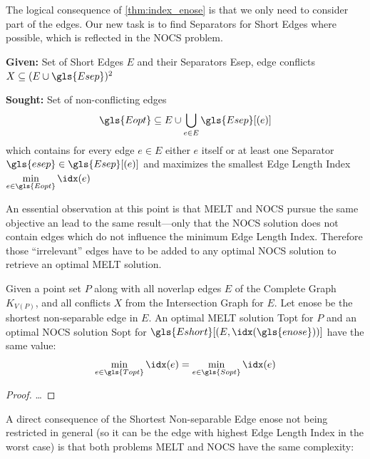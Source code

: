 The logical consequence of \cref{thm:index_enose} is that we only need
to consider part of the edges. Our new task is to find Separators for
Short Edges where possible, which is reflected in the \gls{NOCS}
problem.

\begin{problem}
  \hfill
  \begin{labeling}{\hspace{4em}}
    \item[\textbf{Given:}]
      Set of Short Edges \(E\) and their Separators \gls{Esep},
      edge conflicts \(X \subseteq (E \cup \gls{Esep})^2\)
    \item[\textbf{Sought:}]
      Set of non-conflicting edges
      \[
        \gls{Eopt} \subseteq E
        \cup \bigcup\limits_{e \in E} \gls{Esep}[(e)]
      \]
      which contains for every edge \(e \in E\) either \(e\) itself
      or at least one Separator \(\gls{esep} \in \gls{Esep}[(e)]\)
      and maximizes the smallest Edge Length Index
      \(\min\limits_{e \in \gls{Eopt}} \idx(e)\)
  \end{labeling}
\end{problem}

An essential observation at this point is that \gls{MELT} and
\gls{NOCS} pursue the same objective an lead to the same result---only
that the \gls{NOCS} solution does not contain edges which do not
influence the minimum Edge Length Index. Therefore those
``irrelevant'' edges have to be added to any optimal \gls{NOCS}
solution to retrieve an optimal \gls{MELT} solution.

\begin{theorem}
  \label{thm:equality_melt_nocs}
  Given a point set \(P\) along with all \gls{noverlap} edges \(E\)
  of the Complete Graph \(K_{V(P)}\), and all conflicts \(X\) from the
  Intersection Graph for \(E\). 
  Let \gls{enose} be the shortest non-separable edge in \(E\).
  An optimal \gls{MELT} solution \gls{Topt} for \(P\)
  and an optimal \gls{NOCS} solution \gls{Sopt} for
  \(\gls{Eshort}[(E,\idx(\gls{enose}))]\) have the same value:
  \[
    \min\limits_{e \in \gls{Topt}} \idx(e)
    = \min\limits_{e \in \gls{Sopt}} \idx(e)
  \]
  \begin{proof}
  \ldots{}
  \end{proof}
\end{theorem}

A direct consequence of the Shortest Non-separable Edge \gls{enose}
not being restricted in general (so it can  be the edge with highest
Edge Length Index in the worst case) is that both problems \gls{MELT}
and \gls{NOCS} have the same complexity:

